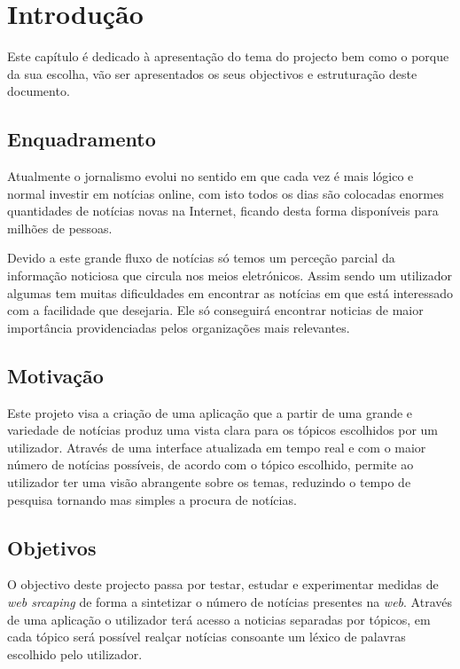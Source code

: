 \chapter{Introdução}
Este capítulo é dedicado à apresentação do tema do projecto bem como o porque da sua escolha, vão ser apresentados os seus objectivos e  estruturação deste documento.

\label{chap:intro}

\section{Enquadramento}
\label{sec:amb} %

Atualmente o jornalismo evolui no sentido em que cada vez é mais lógico e normal investir em notícias online, com isto todos os dias são colocadas enormes quantidades de notícias novas na Internet, ficando desta forma disponíveis para milhões de pessoas.\par
Devido a este grande fluxo de notícias só temos um perceção parcial da informação noticiosa que circula nos meios eletrónicos. Assim sendo um utilizador algumas tem muitas dificuldades em encontrar as notícias em que está interessado com a facilidade que desejaria. Ele só conseguirá encontrar noticias de maior importância providenciadas pelos organizações mais relevantes.



\section{Motivação}
\label{sec:mot}
Este projeto visa a criação de uma aplicação que a partir de uma grande e variedade de notícias produz uma vista clara para os tópicos escolhidos por um utilizador. Através de uma interface atualizada em tempo real e com o maior número de notícias possíveis, de acordo com o tópico escolhido, permite ao utilizador ter uma visão abrangente sobre os temas, reduzindo o tempo de pesquisa tornando mas simples a procura de notícias.

\section{Objetivos}
\label{sec:obj}
O objectivo deste projecto passa por testar, estudar e experimentar medidas de \emph{web srcaping} de forma a sintetizar o número de notícias presentes na \emph{web}. Através de uma aplicação o utilizador terá acesso a noticias separadas por tópicos, em cada tópico será possível realçar notícias consoante um léxico de palavras escolhido pelo utilizador. 


